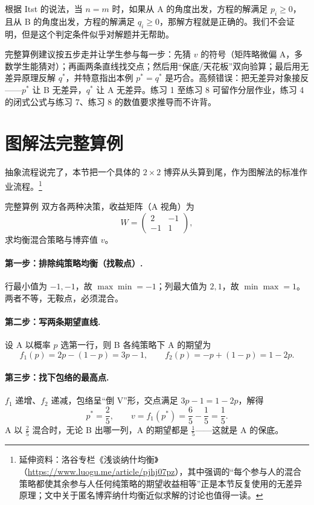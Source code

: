 根据 Itst 的说法，当 $n=m$ 时，如果从 A 的角度出发，方程的解满足 $p_i\ge0$，且从 B 的角度出发，方程的解满足 $q_i\ge0$，那解方程就是正确的。我们不会证明，但是这个判定条件似乎对解题并无帮助。

\begin{teach}[数值算例的课堂流程]
完整算例建议按五步走并让学生参与每一步：先猜 $v$ 的符号（矩阵略微偏 A，多数学生能猜对）；再画两条直线找交点；然后用“保底/天花板”双向验算；最后用无差异原理反解 $q^*$，并特意指出本例 $p^*=q^*$ 是巧合。高频错误：把无差异对象接反——$p^*$ 让 B 无差异，$q^*$ 让 A 无差异。练习 1 至练习 8 可留作分层作业，练习 4 的闭式公式与练习 7、练习 8 的数值要求推导而不许背。
\end{teach}
\section{图解法完整算例}
抽象流程说完了，本节把一个具体的 $2\times2$ 博弈从头算到尾，作为图解法的标准作业流程。\footnote{延伸资料：洛谷专栏《浅谈纳什均衡》（\url{https://www.luogu.me/article/pjhj07pz}），其中强调的“每个参与人的混合策略都使其余参与人任何纯策略的期望收益相等”正是本节反复使用的无差异原理；文中关于匿名博弈纳什均衡近似求解的讨论也值得一读。}

\begin{problem}{完整算例}
双方各两种决策，收益矩阵（A 视角）为
\[
 W=\begin{pmatrix}2&-1\\-1&1\end{pmatrix},
\]
求均衡混合策略与博弈值 $v$。
\end{problem}

\sol \paragraph{第一步：排除纯策略均衡（找鞍点）.} 行最小值为 $-1,-1$，故 $\max\min=-1$；列最大值为 $2,1$，故 $\min\max=1$。两者不等，无鞍点，必须混合。

\paragraph{第二步：写两条期望直线.} 设 A 以概率 $p$ 选第一行，则 B 各纯策略下 A 的期望为
\[
 f_1(p)=2p-(1-p)=3p-1,\qquad f_2(p)=-p+(1-p)=1-2p .
\]
\paragraph{第三步：找下包络的最高点.} $f_1$ 递增、$f_2$ 递减，包络呈“倒 V”形，交点满足 $3p-1=1-2p$，解得
\[
 p^{*}=\frac25,\qquad v=f_1(p^{*})=\frac65-\frac15=\frac15 .
\]
A 以 $\tfrac25$ 混合时，无论 B 出哪一列，A 的期望都是 $\tfrac15$——这就是 A 的保底。

